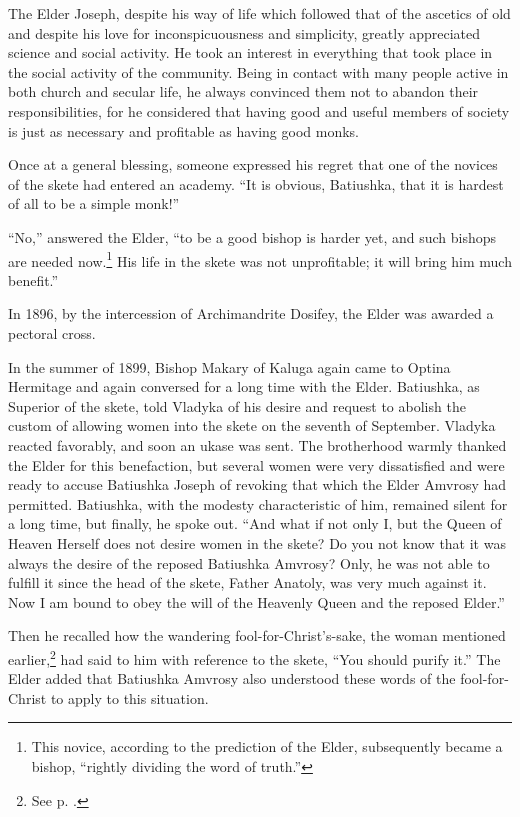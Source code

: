 The Elder Joseph, despite his way of life which followed that of the ascetics of old and despite his love for inconspicuousness and simplicity, greatly appreciated science and social activity. He took an interest in everything that took place in the social activity of the community. Being in contact with many people active in both church and secular life, he always convinced them not to abandon their responsibilities, for he considered that having good and useful members of society is just as necessary and profitable as having good monks.

Once at a general blessing, someone expressed his regret that one of the novices of the skete had entered an academy. ``It is obvious, Batiushka, that it is hardest of all to be a simple monk!''

``No,'' answered the Elder, ``to be a good bishop is harder yet, and such bishops are needed now.\footnote{This novice, according to the prediction of the Elder, subsequently became a bishop, ``rightly dividing the word of truth.''} His life in the skete was not unprofitable; it will bring him much benefit.''

In 1896, by the intercession of Archimandrite Dosifey, the Elder was awarded a pectoral cross.

In the summer of 1899, Bishop Makary of Kaluga again came to Optina Hermitage and again conversed for a long time with the Elder. Batiushka, as Superior of the skete, told Vladyka of his desire and request to abolish the custom of allowing women into the skete on the seventh of September. Vladyka reacted favorably, and soon an ukase was sent. The brotherhood warmly thanked the Elder for this benefaction, but several women were very dissatisfied and were ready to accuse Batiushka Joseph of revoking that which the Elder Amvrosy had permitted. Batiushka, with the modesty characteristic of him, remained silent for a long time, but finally, he spoke out. ``And what if not only I, but the Queen of Heaven Herself does not desire women in the skete? Do you not know that it was always the desire of the reposed Batiushka Amvrosy? Only, he was not able to fulfill it since the head of the skete, Father Anatoly, was very much against it. Now I am bound to obey the will of the Heavenly Queen and the reposed Elder.''

Then he recalled how the wandering fool-for-Christ's-sake, the woman mentioned earlier,\footnote{See p. \pageref{lady-before}.} had said to him with reference to the skete, ``You should purify it.'' The Elder added that Batiushka Amvrosy also understood these words of the fool-for-Christ to apply to this situation.

